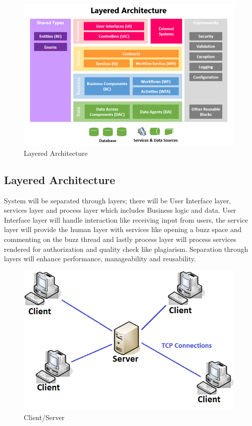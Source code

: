 
\begin{figure}[H]	
\graphicspath{ {images/} }
    	\includegraphics[scale=0.5]{layered.png}
    	\caption{Layered Architecture }
	\end{figure}
\subsection*{Layered Architecture}

System will be separated through layers; there will be User Interface  layer, services layer and process layer which includes Business logic and data. User Interface layer will handle interaction like receiving input from users, the service layer will provide the human layer with services like opening a buzz space and commenting on the buzz thread and lastly process layer will process services rendered for authorization and quality check like plagiarism. Separation through layers will enhance performance, manageability and reusability.

\begin{figure}[H]	
\graphicspath{ {images/} }
    	\includegraphics[scale=0.5]{csp.png}
    	\caption{Client/Server}
	\end{figure}
	
